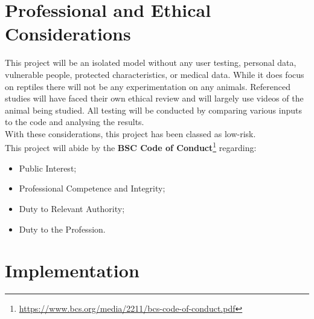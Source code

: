 \documentclass{article}
\begin{document}
\newpage
\section{Professional and Ethical Considerations}
\label{sec:Ethics}
This project will be an isolated model without any user testing, personal data, vulnerable people, protected characteristics, or medical data. While it does focus on reptiles there will not be any experimentation on any animals. Referenced studies will have faced their own ethical review and will largely use videos of the animal being studied. All testing will be conducted by comparing various inputs to the code and analysing the results.\\
With these considerations, this project has been classed as low-risk.\\

This project will abide by the \textbf{BSC Code of Conduct}\footnote{\url{https://www.bcs.org/media/2211/bcs-code-of-conduct.pdf}} regarding:
\begin{itemize}
 \item Public Interest;
 \item Professional Competence and Integrity;
 \item Duty to Relevant Authority;
 \item Duty to the Profession.
 \end{itemize}

\makeatletter
\renewcommand\footnoterule{\kern-3\p@\hrule\@width\ifodd\value{page}6in\else6in\fi\kern2.6\p@}
\makeatother 
    



\newpage
\section{Implementation}
\label{sec:Implementation}
\end{document}
